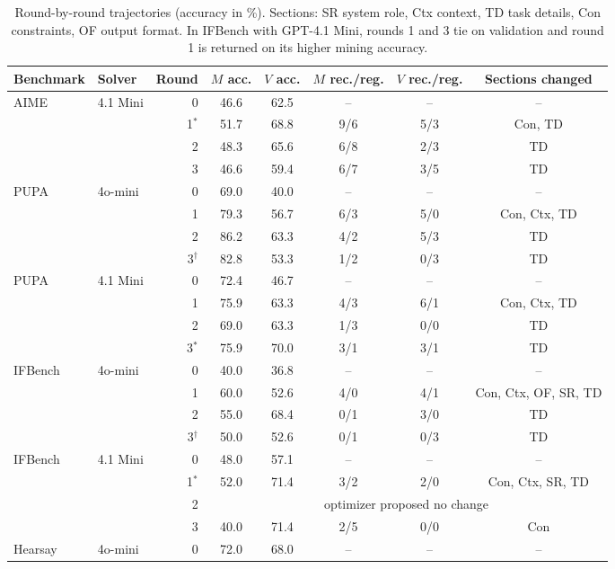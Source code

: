 \documentclass[10pt]{article} %
\begin{document}
\begin{table}[htbp]
\caption{Round-by-round trajectories (accuracy in \%). Sections: SR system role, Ctx context, TD task details,
Con constraints, OF output format. In IFBench with GPT-4.1 Mini, rounds 1 and 3 tie on validation and round 1
is returned on its higher mining accuracy.}
\label{tab:rounds}
\begin{center}
\small
\setlength{\tabcolsep}{4pt}
\begin{tabular}{llrccccc}
\toprule
\rowcolor{midblue}Benchmark & Solver & Round & $M$ acc. & $V$ acc. & $M$ rec./reg. & $V$ rec./reg. & Sections changed \\
\midrule
AIME & 4.1 Mini & 0 & 46.6 & 62.5 & -- & -- & -- \\
 & & 1$^*$ & 51.7 & 68.8 & 9/6 & 5/3 & Con, TD \\
 & & 2 & 48.3 & 65.6 & 6/8 & 2/3 & TD \\
 & & 3 & 46.6 & 59.4 & 6/7 & 3/5 & TD \\
\midrule
PUPA & 4o-mini & 0 & 69.0 & 40.0 & -- & -- & -- \\
 & & 1 & 79.3 & 56.7 & 6/3 & 5/0 & Con, Ctx, TD \\
 & & 2 & 86.2 & 63.3 & 4/2 & 5/3 & TD \\
 & & 3$^\dagger$ & 82.8 & 53.3 & 1/2 & 0/3 & TD \\
\midrule
PUPA & 4.1 Mini & 0 & 72.4 & 46.7 & -- & -- & -- \\
 & & 1 & 75.9 & 63.3 & 4/3 & 6/1 & Con, Ctx, TD \\
 & & 2 & 69.0 & 63.3 & 1/3 & 0/0 & TD \\
 & & 3$^*$ & 75.9 & 70.0 & 3/1 & 3/1 & TD \\
\midrule
IFBench & 4o-mini & 0 & 40.0 & 36.8 & -- & -- & -- \\
 & & 1 & 60.0 & 52.6 & 4/0 & 4/1 & Con, Ctx, OF, SR, TD \\
 & & 2 & 55.0 & 68.4 & 0/1 & 3/0 & TD \\
 & & 3$^\dagger$ & 50.0 & 52.6 & 0/1 & 0/3 & TD \\
\midrule
IFBench & 4.1 Mini & 0 & 48.0 & 57.1 & -- & -- & -- \\
 & & 1$^*$ & 52.0 & 71.4 & 3/2 & 2/0 & Con, Ctx, SR, TD \\
 & & 2 & \multicolumn{5}{c}{optimizer proposed no change} \\
 & & 3 & 40.0 & 71.4 & 2/5 & 0/0 & Con \\
\midrule
Hearsay & 4o-mini & 0 & 72.0 & 68.0 & -- & -- & -- \\

\end{tabular}
\end{center}
\end{table}
\end{document}
